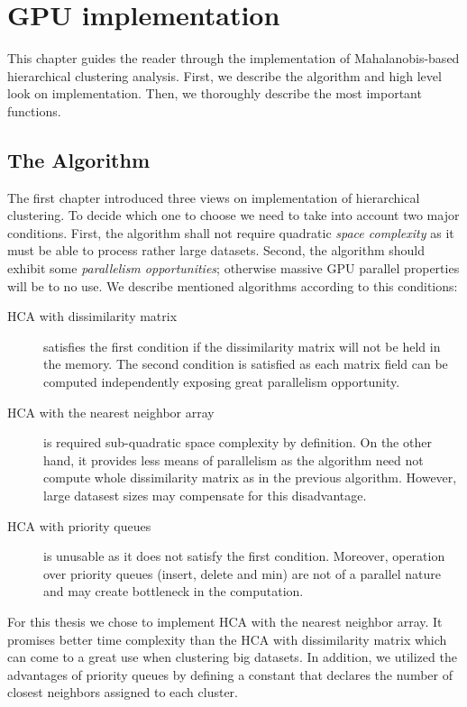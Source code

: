 \chapter{GPU implementation}

This chapter guides the reader through the implementation of Mahalanobis-based hierarchical clustering analysis. First, we describe the algorithm and high level look on implementation. Then, we thoroughly describe the most important functions.

\section{The Algorithm}

The first chapter introduced three views on implementation of hierarchical clustering. To decide which one to choose we need to take into account two major conditions. First, the algorithm shall not require quadratic \emph{space complexity} as it must be able to process rather large datasets. Second, the algorithm should exhibit some \emph{parallelism opportunities}; otherwise massive GPU parallel properties will be to no use.  We describe mentioned algorithms according to this conditions:
\begin{description}

\item[HCA with dissimilarity matrix] satisfies the first condition if the dissimilarity matrix will not be held in the memory. The second condition is satisfied as each matrix field can be computed independently exposing great parallelism opportunity. 

\item[HCA with the nearest neighbor array] is required sub-quadratic space complexity by definition. On the other hand, it provides less means of parallelism as the algorithm need not compute whole dissimilarity matrix as in the previous algorithm. However, large datasest sizes may compensate for this disadvantage. 

\item[HCA with priority queues] is unusable as it does not satisfy the first condition. Moreover, operation over priority queues (insert, delete and min) are not of a parallel nature and may create bottleneck in the computation.

\end{description}

For this thesis we chose to implement HCA with the nearest neighbor array. It promises better time complexity than the HCA with dissimilarity matrix which can come to a great use when clustering big datasets. In addition, we utilized the advantages of priority queues by defining a constant that declares the number of closest neighbors assigned to each cluster.

